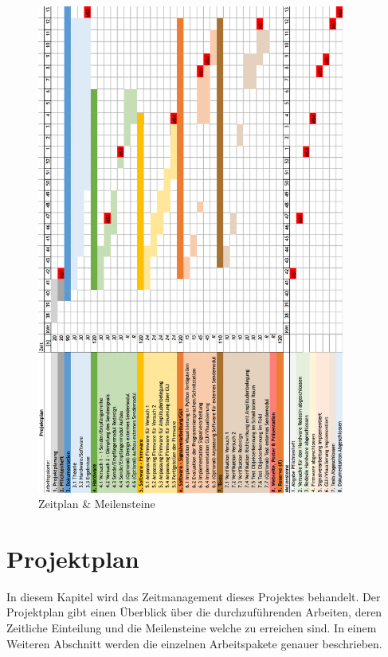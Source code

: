 \documentclass[10pt,a4paper,oneside]{99_fhnwreport}
\begin{document}
\clearpage


\begin{figure}[htb]
\includegraphics[width=0.9\textwidth,angle=0]{graphics/image_zeitplan.png}
\caption{Zeitplan \& Meilensteine} %
\label{fig:img_zeitplan}
\end{figure}
%

\clearpage
\section{Projektplan}\label{sec:projektplan}
In diesem Kapitel wird das Zeitmanagement dieses Projektes behandelt. Der Projektplan gibt einen Überblick über die durchzuführenden Arbeiten, deren Zeitliche Einteilung und die Meilensteine welche zu erreichen sind. In einem Weiteren Abschnitt werden die einzelnen Arbeitspakete genauer beschrieben.
\end{document}
